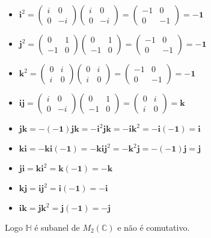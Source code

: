 \documentclass[10pt,a4paper]{article}
\begin{document}
\begin{itemize}
\item $\textbf{i}^2=\begin{pmatrix}
i&0\\0&-i
\end{pmatrix}\begin{pmatrix}
i&0\\0&-i
\end{pmatrix}=\begin{pmatrix}
-1&0\\0&-1
\end{pmatrix}=-\textbf{1}$
\item $\textbf{j}^2=\begin{pmatrix}
0&1\\-1&0
\end{pmatrix}\begin{pmatrix}
0&1\\-1&0
\end{pmatrix}=\begin{pmatrix}
-1&0\\0&-1
\end{pmatrix}=-\textbf{1}$
\item $\textbf{k}^2=\begin{pmatrix}
0&i\\i&0
\end{pmatrix}\begin{pmatrix}
0&i\\i&0
\end{pmatrix}=\begin{pmatrix}
-1&0\\0&-1
\end{pmatrix}=-\textbf{1}$
\item $\textbf{ij}=\begin{pmatrix}
i&0\\0&-i
\end{pmatrix}\begin{pmatrix}
0&1\\-1&0
\end{pmatrix}=\begin{pmatrix}
0&i\\i&0
\end{pmatrix}=\textbf{k}$
\item $\textbf{j}\textbf{k}=-(-\textbf{1})\textbf{j}\textbf{k}=-\textbf{i}^2\textbf{j}\textbf{k}=-\textbf{i}\textbf{k}^2=-\textbf{i}(-\textbf{1})=\textbf{i}$
\item $\textbf{k}\textbf{i}=-\textbf{k}\textbf{i}(-\textbf{1})=-\textbf{k}\textbf{i}\textbf{j}^2=-\textbf{k}^2\textbf{j}=-(-\textbf{1})\textbf{j}=\textbf{j}$
\item $\textbf{j}\textbf{i}=\textbf{k}\textbf{i}^2=\textbf{k}(-\textbf{1})=-\textbf{k}$
\item $\textbf{k}\textbf{j}=\textbf{i}\textbf{j}^2=\textbf{i}(-\textbf{1})=-\textbf{i}$
\item $\textbf{i}\textbf{k}=\textbf{j}\textbf{k}^2=\textbf{j}(-\textbf{1})=-\textbf{j}$
\end{itemize}
Logo $\mathbb{H}$ é subanel de $M_2(\mathbb{C})$ e não é comutativo.
\end{document}
